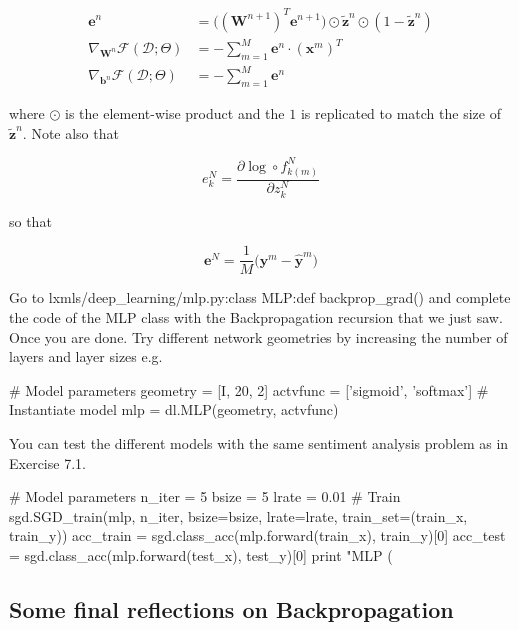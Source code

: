 \begin{align}
\mathbf{e}^{n} & = \Big((\mathbf{W}^{n+1})^T \mathbf{e}^{n+1}\Big) \odot \tilde{\mathbf{z}}^n \odot (1-\tilde{\mathbf{z}}^n)\\
\nabla_{\mathbf{W}^n}\mathcal{F}(\mathcal{D};\Theta) & = -\sum_{m=1}^M \mathbf{e}^{n} \cdot \left(\mathbf{x}^m\right)^T \\ 
\nabla_{\mathbf{b}^n}\mathcal{F}(\mathcal{D};\Theta) & = -\sum_{m=1}^M \mathbf{e}^{n}  
\end{align}

\noindent where $\odot$ is the element-wise product and the $1$ is replicated to
match the size of $\tilde{\mathbf{z}}^n$. Note also that 

\begin{equation}
e^N_k = \frac{\partial \log \circ f_{k(m)}^N}{\partial z^{N}_{k}}  
\label{eq:finalError}
\end{equation}

\noindent so that

\begin{equation}
\mathbf{e}^N =\frac{1}{M}\Big(\mathbf{y}^m - \hat{\mathbf{y}}^m \Big)  
\end{equation}

\begin{exercise}
Go to lxmls/deep\_learning/mlp.py:class MLP:def backprop\_grad() and complete
the code of the MLP class with the Backpropagation recursion that we just saw.
Once you are done. Try different network geometries by increasing the number of
layers and layer sizes e.g.
\begin{python}
# Model parameters
geometry = [I, 20, 2]
actvfunc = ['sigmoid', 'softmax'] 
# Instantiate model
mlp      = dl.MLP(geometry, actvfunc) 
\end{python}
You can test the different models with the same sentiment analysis problem as
in Exercise 7.1. 
\begin{python}
# Model parameters
n_iter = 5
bsize  = 5
lrate  = 0.01
# Train
sgd.SGD_train(mlp, n_iter, bsize=bsize, lrate=lrate, train_set=(train_x, train_y))
acc_train = sgd.class_acc(mlp.forward(train_x), train_y)[0]
acc_test  = sgd.class_acc(mlp.forward(test_x), test_y)[0]
print "MLP (%
\end{python}
\end{exercise}

\subsection{Some final reflections on Backpropagation}

